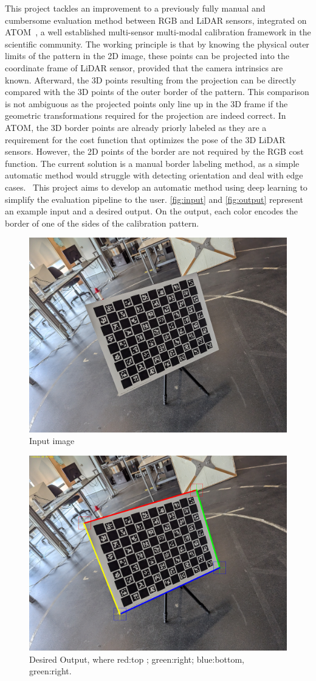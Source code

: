 This project tackles an improvement to a previously fully manual and cumbersome evaluation method between RGB and LiDAR sensors,
integrated on ATOM~\cite{atom}, a well established multi-sensor multi-modal calibration framework in the
scientific community. The working principle is that by knowing the
physical outer limits of the pattern in the 2D image, these points can be projected into the coordinate frame of LiDAR sensor, provided
that the camera intrinsics are known. Afterward, the 3D points resulting from the projection can be directly compared with the 3D
points of the outer border of the pattern. This comparison is not ambiguous as the projected points only line up in the 3D frame if the
geometric transformations required for the projection are indeed correct. In ATOM, the 3D border points are already priorly labeled as
they are a requirement for the cost function that optimizes the pose of the 3D LiDAR sensors. However, the 2D points of the border are not
required by the RGB cost function. The current solution is a manual border labeling method, as a
simple automatic method would struggle with detecting orientation and deal with edge cases.~\cite{camera_lidar} This
project aims to develop an automatic method using deep learning to simplify the evaluation pipeline to the user. \autoref{fig:input}
and \autoref{fig:output} represent an example input and a desired output. On the output, each color encodes the border of one of the
sides of the calibration pattern.

\begin{figure}[h]
    \centering
    \includegraphics[width=0.8\linewidth]{resources/images/pattern_28.jpg}
    \caption{Input image}
    \label{fig:input}
\end{figure}

\begin{figure}[h]
    \centering
    \includegraphics[width=0.8\linewidth]{resources/images/pattern_28_lines.png}
    \caption{Desired Output, where red:top ; green:right; blue:bottom, green:right.}
    \label{fig:output}
\end{figure}
